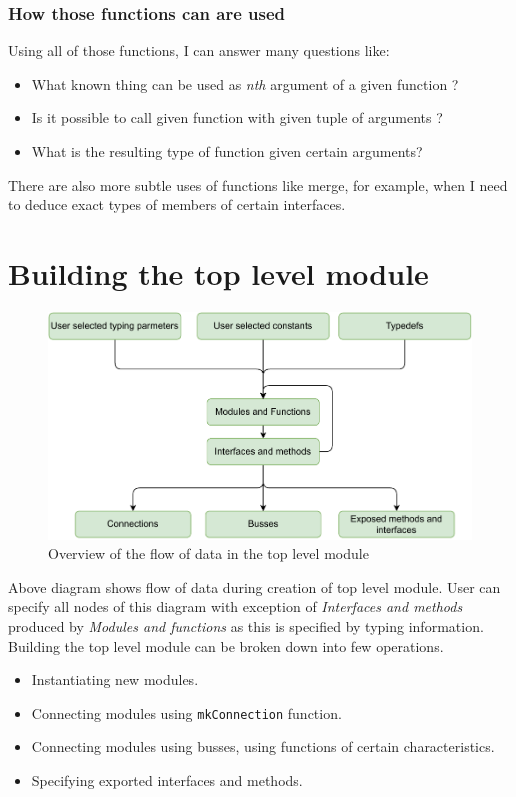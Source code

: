 \documentclass[12pt]{report}
\begin{document}
\subsubsection{How those functions can are used}
Using all of those functions, I can answer many questions like:
\begin{itemize}
    \item What known thing can be used as \emph{nth} argument of a given function ?
    \item Is it possible to call given function with given tuple of arguments ?
    \item What is the resulting type of function given certain arguments?
\end{itemize}
There are also more subtle uses of functions like merge, for example, when I need to deduce exact types of members of certain interfaces.
\newpage
\section{Building the top level module}
\begin{figure}[!h]
    \centering
    \caption{Overview of the flow of data in the top level module}

    \includegraphics[width=1.0\columnwidth]{pdfExports/LargeMap-dataFlow.drawio.pdf}
\end{figure}
Above diagram shows flow of data during creation of top level module. User can specify all nodes of this diagram with exception of \emph{Interfaces and methods} produced by \emph{Modules and functions} as this is specified by typing information.
Building the top level module can be broken down into few operations.
\begin{itemize}
    \item Instantiating new modules.
    \item Connecting modules using \verb!mkConnection! function.
    \item Connecting modules using busses, using functions of certain characteristics.
    \item Specifying exported interfaces and methods.
\end{itemize} 
\end{document}
